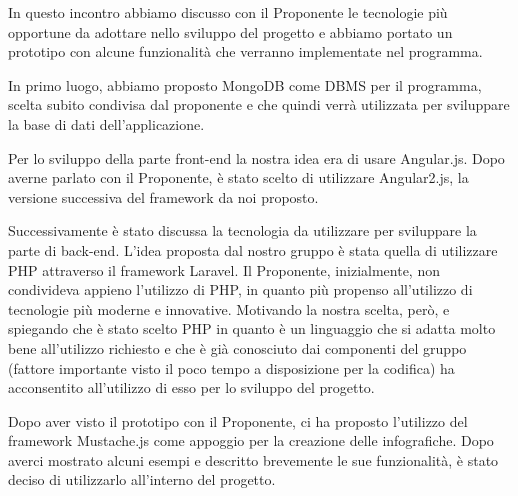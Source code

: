 In questo incontro abbiamo discusso con il Proponente le tecnologie più opportune da adottare nello sviluppo del progetto e abbiamo portato un prototipo con alcune funzionalità che verranno implementate nel programma.

In primo luogo, abbiamo proposto MongoDB come DBMS per il programma, scelta subito condivisa dal proponente e che quindi verrà utilizzata per sviluppare la base di dati dell'applicazione.

Per lo sviluppo della parte front-end la nostra idea era di usare Angular.js. Dopo averne parlato con il Proponente, è stato scelto di utilizzare Angular2.js, la versione successiva del framework da noi proposto.

Successivamente è stato discussa la tecnologia da utilizzare per sviluppare la parte di back-end. L'idea proposta dal nostro gruppo è stata quella di utilizzare PHP attraverso il framework Laravel. Il Proponente, inizialmente, non condivideva appieno l'utilizzo di PHP, in quanto più propenso all'utilizzo di tecnologie più moderne e innovative. Motivando la nostra scelta, però, e spiegando che è stato scelto PHP in quanto è un linguaggio che si adatta molto bene all'utilizzo richiesto e che è già conosciuto dai componenti del gruppo (fattore importante visto il poco tempo a disposizione per la codifica) ha acconsentito all'utilizzo di esso per lo sviluppo del progetto.

Dopo aver visto il prototipo con il Proponente, ci ha proposto l'utilizzo del framework Mustache.js come appoggio per la creazione delle infografiche. Dopo averci mostrato alcuni esempi e descritto brevemente le sue funzionalità, è stato deciso di utilizzarlo all'interno del progetto.